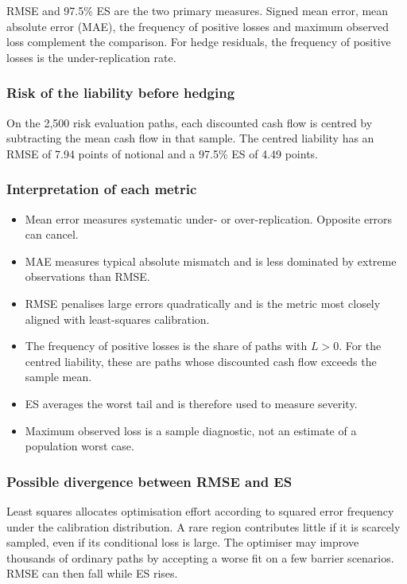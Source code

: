 \documentclass[12pt,a4paper]{article}
\newcommand{\1}{\mathbf{1}}
\begin{document}
RMSE and 97.5\% ES are the two primary measures. Signed mean error, mean absolute error (MAE), the frequency of positive losses and maximum observed loss complement the comparison. For hedge residuals, the frequency of positive losses is the under-replication rate.

\subsubsection*{Risk of the liability before hedging}

On the 2,500 risk evaluation paths, each discounted cash flow is centred by subtracting the mean cash flow in that sample. The centred liability has an RMSE of 7.94 points of notional and a 97.5\% ES of 4.49 points.

\subsubsection*{Interpretation of each metric}

\begin{itemize}
\item Mean error measures systematic under- or over-replication. Opposite
errors can cancel.
\item MAE measures typical absolute mismatch and is less dominated by extreme
observations than RMSE.
\item RMSE penalises large errors quadratically and is the metric most closely
aligned with least-squares calibration.
\item The frequency of positive losses is the share of paths with $L>0$. For the centred liability, these are paths whose discounted cash flow exceeds the sample mean.
\item ES averages the worst tail and is therefore used to measure severity.
\item Maximum observed loss is a sample diagnostic, not an estimate of a
population worst case.
\end{itemize}

\subsubsection*{Possible divergence between RMSE and ES}

Least squares allocates optimisation effort according to squared error
frequency under the calibration distribution. A rare region contributes little
if it is scarcely sampled, even if its conditional loss is large. The
optimiser may improve thousands of ordinary paths by accepting a worse fit on
a few barrier scenarios. RMSE can then fall while ES rises.
\end{document}
